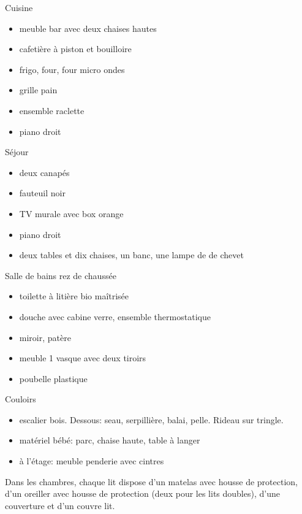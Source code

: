 \documentclass[a4paper,11pt]{article}
\begin{document}
\vspace{0.25cm}

Cuisine
\begin{itemize}
\item meuble bar avec deux chaises hautes 
\item cafetière à piston et bouilloire
\item frigo, four, four micro ondes
\item grille pain
\item ensemble raclette
\item piano droit
\end{itemize}

\vspace{0.25cm}

Séjour
\begin{itemize}
\item deux canapés
\item fauteuil noir
\item TV murale avec box orange
\item piano droit
\item deux tables et dix chaises, un banc, une lampe de de chevet
\end{itemize}

\vspace{0.25cm}

Salle de bains rez de chaussée
\begin{itemize}
\item toilette à litière bio maîtrisée
\item douche avec cabine verre, ensemble thermostatique
\item miroir, patère
\item meuble 1 vasque avec deux tiroirs
\item poubelle plastique
\end{itemize}

\vspace{0.25cm}
Couloirs
\begin{itemize}
\item escalier bois. Dessous: seau, serpillière, balai, pelle. Rideau sur tringle.
\item matériel bébé: parc, chaise haute, table à langer
\item à l'étage: meuble penderie avec cintres
\end{itemize}

Dans les chambres, chaque lit dispose d'un matelas avec housse de protection, d'un oreiller avec housse de protection (deux pour les lits doubles),  d'une couverture et d'un couvre lit.
\end{document}
